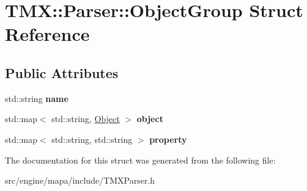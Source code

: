 \hypertarget{struct_t_m_x_1_1_parser_1_1_object_group}{}\section{T\+MX\+:\+:Parser\+:\+:Object\+Group Struct Reference}
\label{struct_t_m_x_1_1_parser_1_1_object_group}
\subsection*{Public Attributes}
\begin{DoxyCompactItemize}
\item 
std\+::string {\bfseries name}\hypertarget{struct_t_m_x_1_1_parser_1_1_object_group_ac7b39791c8a36a526b70fed65622c8c6}{}\label{struct_t_m_x_1_1_parser_1_1_object_group_ac7b39791c8a36a526b70fed65622c8c6}

\item 
std\+::map$<$ std\+::string, \hyperlink{struct_t_m_x_1_1_parser_1_1_object}{Object} $>$ {\bfseries object}\hypertarget{struct_t_m_x_1_1_parser_1_1_object_group_aa39e4755fe5ddce440d916799c5b2cf3}{}\label{struct_t_m_x_1_1_parser_1_1_object_group_aa39e4755fe5ddce440d916799c5b2cf3}

\item 
std\+::map$<$ std\+::string, std\+::string $>$ {\bfseries property}\hypertarget{struct_t_m_x_1_1_parser_1_1_object_group_a358031609687a52cd4eca535314e7271}{}\label{struct_t_m_x_1_1_parser_1_1_object_group_a358031609687a52cd4eca535314e7271}

\end{DoxyCompactItemize}


The documentation for this struct was generated from the following file\+:\begin{DoxyCompactItemize}
\item 
src/engine/mapa/include/T\+M\+X\+Parser.\+h\end{DoxyCompactItemize}
